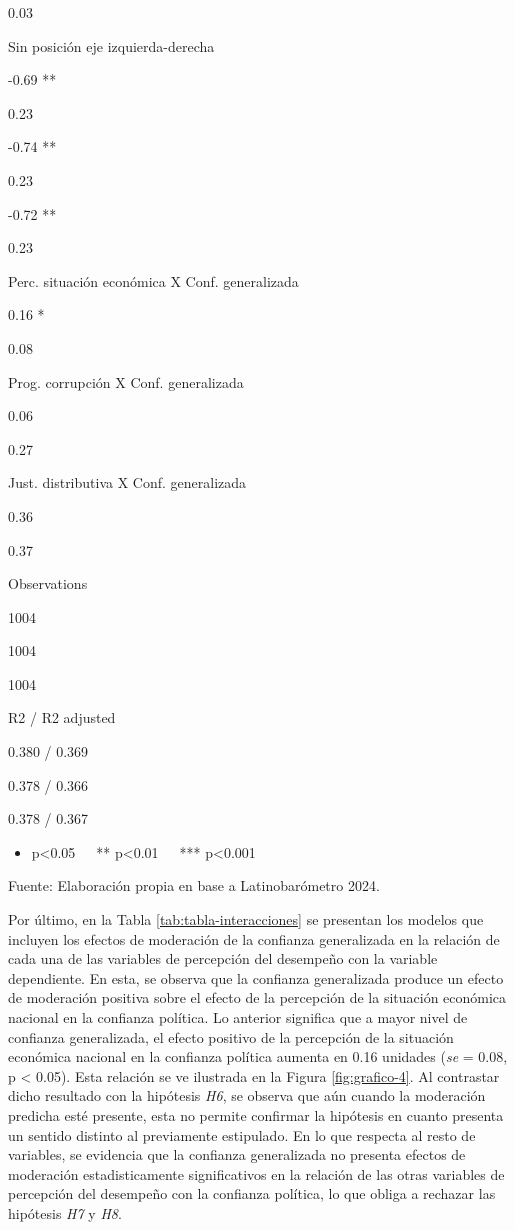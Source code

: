\documentclass[12pt,twoside]{templates/facsothesis}
\providecommand{\tightlist}{%
  \setlength{\itemsep}{0pt}\setlength{\parskip}{0pt}}
\begin{document}
0.03

Sin posición eje izquierda-derecha

-0.69 **

0.23

-0.74 **

0.23

-0.72 **

0.23

Perc. situación económica X Conf. generalizada

0.16 *

0.08

Prog. corrupción X Conf. generalizada

0.06

0.27

Just. distributiva X Conf. generalizada

0.36

0.37

Observations

1004

1004

1004

R2 / R2 adjusted

0.380 / 0.369

0.378 / 0.366

0.378 / 0.367

\begin{itemize}
\tightlist
\item
  p\textless0.05~~~** p\textless0.01~~~*** p\textless0.001
\end{itemize}

Fuente: Elaboración propia en base a Latinobarómetro 2024.

Por último, en la Tabla \ref{tab:tabla-interacciones} se presentan los modelos que incluyen los efectos de moderación de la confianza generalizada en la relación de cada una de las variables de percepción del desempeño con la variable dependiente. En esta, se observa que la confianza generalizada produce un efecto de moderación positiva sobre el efecto de la percepción de la situación económica nacional en la confianza política. Lo anterior significa que a mayor nivel de confianza generalizada, el efecto positivo de la percepción de la situación económica nacional en la confianza política aumenta en 0.16 unidades (\emph{se} = 0.08, p \textless{} 0.05). Esta relación se ve ilustrada en la Figura \ref{fig:grafico-4}. Al contrastar dicho resultado con la hipótesis \emph{H6}, se observa que aún cuando la moderación predicha esté presente, esta no permite confirmar la hipótesis en cuanto presenta un sentido distinto al previamente estipulado. En lo que respecta al resto de variables, se evidencia que la confianza generalizada no presenta efectos de moderación estadisticamente significativos en la relación de las otras variables de percepción del desempeño con la confianza política, lo que obliga a rechazar las hipótesis \emph{H7} y \emph{H8}.
\end{document}
